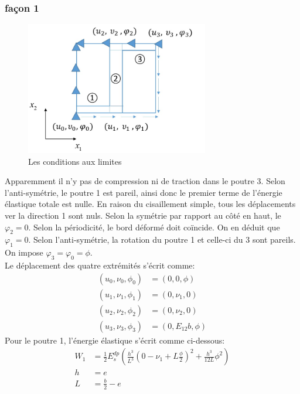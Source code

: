 \documentclass{article}
\begin{document}
\subsubsection{façon 1}
\begin{figure}[H]
    \begin{center}
    \includegraphics[width=8cm]{img/cisaillement.jpg}
    \end{center}
    \caption{Les conditions aux limites}
    \label{fig_cisaillement}
\end{figure}
\par
Apparemment il n’y pas de compression ni de traction dans le poutre \large{\textcircled{\small{3}}}. Selon l’anti-symétrie, le poutre \large{\textcircled{\small{1}}} est pareil, ainsi donc le premier terme de l’énergie élastique totale est nulle. En raison du cisaillement simple, tous les déplacements ver la direction 1 sont nuls. Selon la symétrie par rapport au côté en haut, le $\varphi_{2}=0$. Selon la périodicité, le bord déformé doit coïncide. On en déduit que $\varphi_{1}=0$. Selon l’anti-symétrie, la rotation du poutre \large{\textcircled{\small{1}}} et celle-ci du \large{\textcircled{\small{3}}} sont pareils. On impose $\varphi_{3}=\varphi_{0}=\phi$.\\
Le déplacement des quatre extrémités s’écrit comme:
\begin{align*}
    (u_{0},\nu_{0},\phi_{0})&=(0,0,\phi)\\
    (u_{1},\nu_{1},\phi_{1})&=(0,\nu_{1},0)\\
    (u_{2},\nu_{2},\phi_{2})&=(0,\nu_{2},0)\\
    (u_{3},\nu_{3},\phi_{3})&=(0,E_{12}b,\phi)
\end{align*}
Pour le poutre \large{\textcircled{\small{1}}}, l’énergie élastique s’écrit comme ci-dessous:\\
\begin{align*}
    W_{1}&=\frac{1}{2}E_{s}^{dp}(\frac{h^{3}}{L^{3}}(0-\nu_{1}+L\frac{\phi}{2})^{2}+\frac{h^{3}}{12L}\phi^{2})\\
    h&=e\\
    L&=\frac{b}{2}-e
\end{align*}
\end{document}
